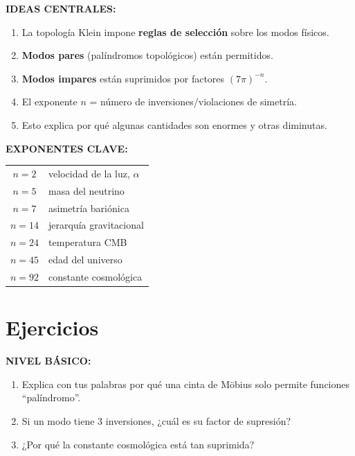 \begin{tcolorbox}[colback=kleingray, colframe=kleinblue, title=\textbf{Resumen del Capítulo 10}]

\textbf{IDEAS CENTRALES:}

\begin{enumerate}
    \item La topología Klein impone \textbf{reglas de selección} sobre los modos físicos.

    \item \textbf{Modos pares} (palíndromos topológicos) están permitidos.

    \item \textbf{Modos impares} están suprimidos por factores $(7\pi)^{-n}$.

    \item El exponente $n$ = número de inversiones/violaciones de simetría.

    \item Esto explica por qué algunas cantidades son enormes y otras diminutas.
\end{enumerate}

\vspace{0.3cm}
\textbf{EXPONENTES CLAVE:}

\begin{center}
\begin{tabular}{cl}
$n=2$ & velocidad de la luz, $\alpha$ \\
$n=5$ & masa del neutrino \\
$n=7$ & asimetría bariónica \\
$n=14$ & jerarquía gravitacional \\
$n=24$ & temperatura CMB \\
$n=45$ & edad del universo \\
$n=92$ & constante cosmológica \\
\end{tabular}
\end{center}

\end{tcolorbox}


\section*{Ejercicios}

\textbf{NIVEL BÁSICO:}
\begin{enumerate}
    \item Explica con tus palabras por qué una cinta de Möbius solo permite
    funciones ``palíndromo''.

    \item Si un modo tiene 3 inversiones, ¿cuál es su factor de supresión?

    \item ¿Por qué la constante cosmológica está tan suprimida?
\end{enumerate}

